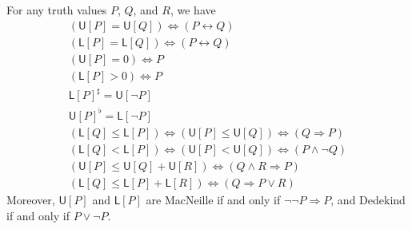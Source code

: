 \documentclass{article}
\def\upp#1{{#1}^{\sharp}}
\def\low#1{{#1}^{\flat}}
\def\U[#1]{\mathsf{U}[#1]}
\def\L[#1]{\mathsf{L}[#1]}
\let\implies\Rightarrow
\begin{document}
\begin{thm}\label{thm:up}
  For any truth values $P$, $Q$, and $R$, we have
  \begin{gather}
    (\U[P] = \U[Q]) \iff (P\leftrightarrow Q)\label{eq:up1}\\
    (\L[P] = \L[Q]) \iff (P\leftrightarrow Q)\label{eq:up2}\\
    (\U[P] = 0) \iff P\label{eq:up3}\\
    (\L[P] > 0) \iff P\label{eq:up4}\\
    \upp{\L[P]} = \U[\neg P]\label{eq:up5}\\
    \low{\U[P]} = \L[\neg P]\label{eq:up6}\\
    (\L[Q] \le \L[P]) \iff (\U[P] \le \U[Q]) \iff (Q\implies P)\label{eq:up7}\\
    (\L[Q] < \L[P]) \iff (\U[P] < \U[Q]) \iff (P \land \neg Q)\label{eq:up8}\\
    (\U[P] \le \U[Q] + \U[R]) \iff (Q\land R \implies P)\label{eq:up9}\\
    (\L[Q] \le \L[P] + \L[R]) \iff (Q \implies P\lor R)\label{eq:up10}
  \end{gather}
  Moreover, $\U[P]$ and $\L[P]$ are MacNeille if and only if $\neg\neg P\implies P$, and Dedekind if and only if $P\lor\neg P$.
\end{thm}
\end{document}
